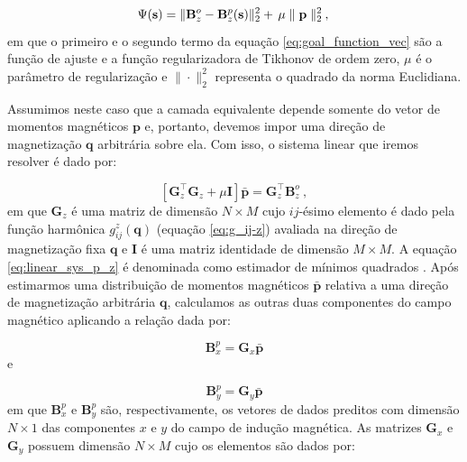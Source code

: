 \begin{equation}
\Psi(\mathbf{s}) =\lVert \mathbf{B}_{z}^{o} - \mathbf{B}_{z}^{p} (\mathbf{s}) 
	\rVert_{2}^{2} + \, \mu  \parallel \mathbf{p} \parallel_{2}^{2} \: , \\
\label{eq:goal_function_vec}
\end{equation}
em que o primeiro e o segundo termo da equação \ref{eq:goal_function_vec} são a função de ajuste e a função regularizadora de Tikhonov de ordem zero, $\mu$ é o parâmetro de regularização e $\| \cdot \|_{2}^{2}$ representa o quadrado da norma Euclidiana. 

Assumimos neste caso que a camada equivalente depende somente do vetor de momentos magnéticos $\mathbf{p}$ e, portanto, devemos impor uma direção de magnetização $\mathbf{q}$ arbitrária sobre ela. Com isso, o sistema linear que iremos resolver é dado por:

\begin{equation}
\left[ \mathbf{G}_{z}^{\top} \mathbf{G}_{z} + \mu \mathbf{I} \right] \bar{\mathbf{p}} = \mathbf{G}_{z}^{\top} \mathbf{B}_{z}^{o} \: ,
\label{eq:linear_sys_p_z}
\end{equation}
em que $\mathbf{G}_{z}$ é uma matriz de dimensão $N \times M$ cujo $ij$-ésimo elemento é dado pela função harmônica $g_{ij}^{z}(\mathbf{q})$ (equação \ref{eq:g_ij-z}) avaliada na direção de magnetização fixa $\mathbf{q}$ e $\mathbf{I}$ é uma matriz identidade de dimensão $M \times M$. A equação \ref{eq:linear_sys_p_z} é denominada como estimador de mínimos quadrados \citep{aster2005}. Após estimarmos uma distribuição de momentos magnéticos $\bar{\mathbf{p}}$ relativa a uma direção de magnetização arbitrária $\mathbf{q}$, calculamos as outras duas componentes do campo magnético aplicando a relação dada por:

\begin{equation}
\mathbf{B}_{x}^{p}  = \mathbf{G}_{x} \bar{\mathbf{p}}
\label{eq:pred_vec_x}
\end{equation}
e

\begin{equation}
\mathbf{B}_{y}^{p}  = \mathbf{G}_{y} \bar{\mathbf{p}}
\label{eq:pred_vec_y}
\end{equation}
em que $\mathbf{B}_{x}^{p}$ e $\mathbf{B}_{y}^{p}$ são, respectivamente, os vetores de dados preditos com dimensão $N \times 1$ das componentes $x$ e $y$ do campo de indução magnética. As matrizes $\mathbf{G}_{x}$ e $\mathbf{G}_{y}$ possuem dimensão $N \times M $ cujo os elementos são dados por: 

